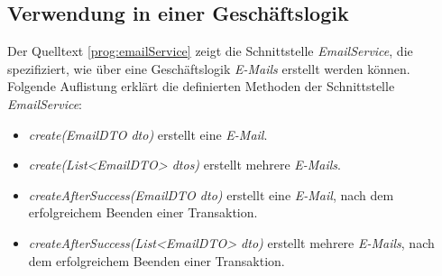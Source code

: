 \subsection{Verwendung in einer Geschäftslogik}
Der Quelltext \ref{prog:emailService} zeigt die Schnittstelle \emph{EmailService}, die spezifiziert, wie über eine Geschäftslogik \emph{E-Mails} erstellt werden können. Folgende Auflistung erklärt die definierten Methoden der Schnittstelle \emph{EmailService}:
\begin{itemize}
	\item\emph{create(EmailDTO dto)} erstellt eine \emph{E-Mail}.
	\item\emph{create(List<EmailDTO> dtos)} erstellt mehrere \emph{E-Mails}.
	\item\emph{createAfterSuccess(EmailDTO dto)} erstellt eine \emph{E-Mail}, nach dem erfolgreichem Beenden einer Transaktion.
	\item\emph{createAfterSuccess(List<EmailDTO> dto)} erstellt mehrere \emph{E-Mails}, nach dem erfolgreichem Beenden einer Transaktion.
\end{itemize} 
\ \newpage

